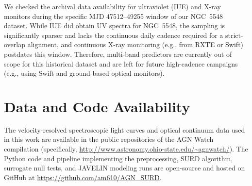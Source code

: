 \documentclass[fleqn,usenatbib]{mnras}
\begin{document}
We checked the archival data availability for ultraviolet (IUE) and X-ray monitors during the specific MJD 47512--49255 window of our NGC~5548 dataset. While IUE did obtain UV spectra for NGC~5548, the sampling is significantly sparser and lacks the continuous daily cadence required for a strict-overlap alignment, and continuous X-ray monitoring (e.g., from RXTE or Swift) postdates this window. Therefore, multi-band predictors are currently out of scope for this historical dataset and are left for future high-cadence campaigns (e.g., using Swift and ground-based optical monitors).

\section*{Data and Code Availability}
The velocity-resolved spectroscopic light curves and optical continuum data used in this work are available in the public repositories of the AGN Watch compilation (specifically, \url{http://www.astronomy.ohio-state.edu/~agnwatch/}). The Python code and pipeline implementing the preprocessing, SURD algorithm, surrogate null tests, and JAVELIN modeling runs are open-source and hosted on GitHub at \url{https://github.com/am610/AGN_SURD}.




%
%

\label{lastpage}
\end{document}
